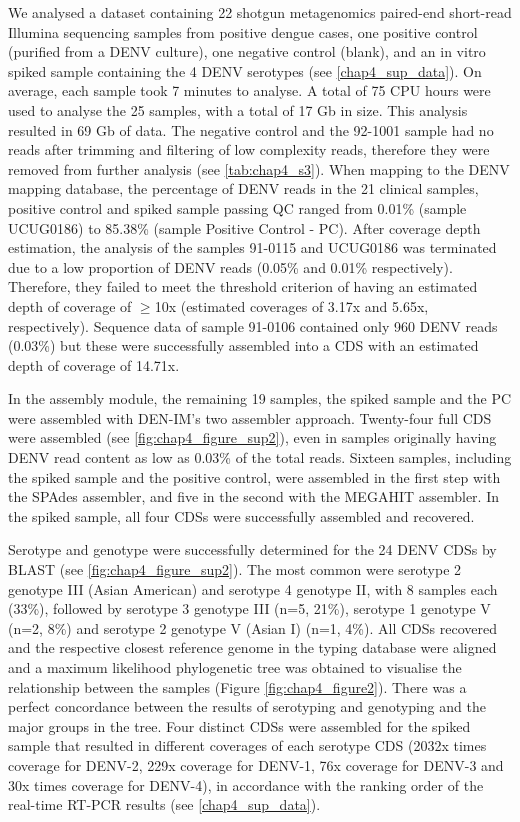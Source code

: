We analysed a dataset containing 22 shotgun metagenomics paired-end short-read Illumina sequencing samples from positive dengue cases, one positive control (purified from a DENV culture), one negative control (blank), and an in vitro spiked sample containing the 4 DENV serotypes (see \ref{chap4_sup_data}). On average, each sample took 7 minutes to analyse. A total of 75 CPU hours were used to analyse the 25 samples, with a total of 17 Gb in size. This analysis resulted in 69 Gb of data. 
The negative control and the 92-1001 sample had no reads after trimming and filtering of low complexity reads, therefore they were removed from further analysis (see \ref{tab:chap4_s3}). When mapping to the DENV mapping database, the percentage of DENV reads in the 21 clinical samples, positive control and spiked sample passing QC ranged from 0.01\% (sample UCUG0186) to 85.38\% (sample Positive Control - PC). After coverage depth estimation, the analysis of the samples 91-0115 and UCUG0186 was terminated due to a low proportion of DENV reads (0.05\% and 0.01\% respectively). Therefore, they failed to meet the threshold criterion of having an estimated depth of coverage of $\geq$10x (estimated coverages of 3.17x and 5.65x, respectively). Sequence data of sample 91-0106 contained only 960 DENV reads (0.03\%) but these were successfully assembled into a CDS with an estimated depth of coverage of 14.71x.

In the assembly module, the remaining 19 samples, the spiked sample and the PC were assembled with DEN-IM’s two assembler approach. Twenty-four full CDS were assembled (see \ref{fig:chap4_figure_sup2}), even in samples originally having DENV read content as low as 0.03\% of the total reads. Sixteen samples, including the spiked sample and the positive control, were assembled in the first step with the SPAdes assembler, and five in the second with the MEGAHIT assembler. In the spiked sample, all four CDSs were successfully assembled and recovered.

Serotype and genotype were successfully determined for the 24 DENV CDSs by BLAST (see \ref{fig:chap4_figure_sup2}). The most common were serotype 2 genotype III (Asian American) and serotype 4 genotype II, with 8 samples each (33\%), followed by serotype 3 genotype III (n=5, 21\%), serotype 1 genotype V (n=2, 8\%) and serotype 2 genotype V (Asian I) (n=1, 4\%). All CDSs recovered and the respective closest reference genome in the typing database were aligned and a maximum likelihood phylogenetic tree was obtained to visualise the relationship between the samples (Figure \ref{fig:chap4_figure2}). There was a perfect concordance between the results of serotyping and genotyping and the major groups in the tree.
Four distinct CDSs were assembled for the spiked sample that resulted in different coverages of each serotype CDS (2032x times coverage for DENV-2, 229x coverage for DENV-1, 76x coverage for DENV-3 and 30x times coverage for DENV-4), in accordance with the ranking order of the real-time RT-PCR results (see \ref{chap4_sup_data}).

